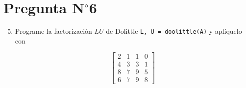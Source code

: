 \section{Pregunta N$^{\circ}$6}

\begin{frame}[fragile]

	\begin{enumerate}\setcounter{enumi}{4}
		\item

		      Programe la factorización $LU$ de Dolittle
		      \texttt{L, U = doolittle(A)} y aplíquelo
		      con

		      \begin{equation*}
			      \begin{bmatrix}
				      2 & 1 & 1 & 0 \\
				      4 & 3 & 3 & 1 \\
				      8 & 7 & 9 & 5 \\
				      6 & 7 & 9 & 8
			      \end{bmatrix}
		      \end{equation*}
	\end{enumerate}

	\begin{solution}
		\begin{columns}
			\begin{column}{0.48\textwidth}
				\inputminted[fontsize=\tiny,firstline=1,lastline=25]{cpp}{questions/lu.cc}
			\end{column}
			\begin{column}{0.48\textwidth}
				\inputminted[fontsize=\tiny,firstline=1,lastline=23]{text}{questions/lu.txt}
			\end{column}
		\end{columns}
	\end{solution}
\end{frame}

\begin{frame}[t,fragile]
	\begin{solution}
		\begin{columns}
			\begin{column}{0.48\textwidth}
				\inputminted[fontsize=\tiny,firstline=1,lastline=39]{cpp}{questions/src/doolittle.cc}
			\end{column}
			\begin{column}{0.48\textwidth}
				\inputminted[fontsize=\tiny,firstline=1,lastline=17]{cpp}{questions/src/product.cc}

				\

				\inputminted[fontsize=\tiny,firstline=1,lastline=18]{cpp}{questions/src/print.cc}
			\end{column}
		\end{columns}
	\end{solution}
\end{frame}

